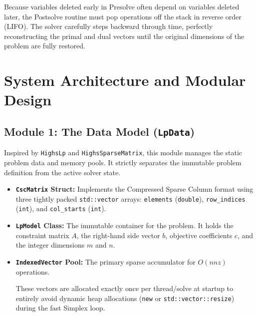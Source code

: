 \documentclass[11pt, a4paper]{article}
\begin{document}
\begin{note}
Because variables deleted early in Presolve often depend on variables deleted later, the Postsolve routine must pop operations off the stack in reverse order (LIFO). The solver carefully steps backward through time, perfectly reconstructing the primal and dual vectors until the original dimensions of the problem are fully restored.
\end{note}



\section{System Architecture and Modular Design}


\subsection{Module 1: The Data Model (\texttt{LpData})}

Inspired by \texttt{HighsLp} and \texttt{HighsSparseMatrix}, this module manages the static problem data and memory pools. It strictly separates the immutable problem definition from the active solver state.

\begin{itemize}[itemsep=4pt, leftmargin=*]
    \item \textbf{\texttt{CscMatrix} Struct:} Implements the Compressed Sparse Column format using three tightly packed \texttt{std::vector} arrays: \texttt{elements} (\texttt{double}), \texttt{row\_indices} (\texttt{int}), and \texttt{col\_starts} (\texttt{int}).
    \item \textbf{\texttt{LpModel} Class:} The immutable container for the problem. It holds the constraint matrix $A$, the right-hand side vector $b$, objective coefficients $c$, and the integer dimensions $m$ and $n$.
    \item \textbf{\texttt{IndexedVector} Pool:} The primary sparse accumulator for $O(nnz)$ operations. 
    \begin{note}
    These vectors are allocated exactly once per thread/solve at startup to entirely avoid dynamic heap allocations (\texttt{new} or \texttt{std::vector::resize}) during the fast Simplex loop.
    \end{note}
\end{itemize}
\end{document}
